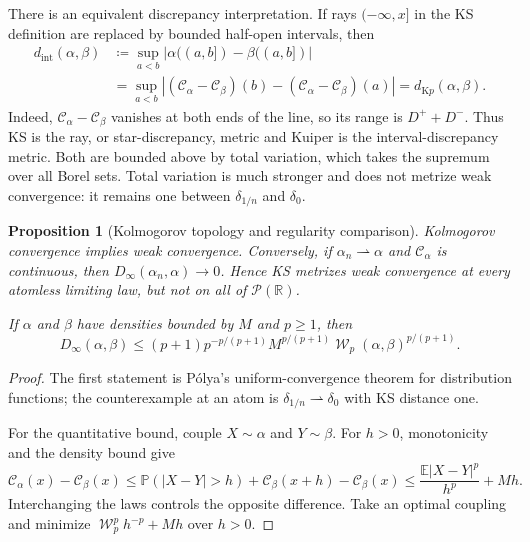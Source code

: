 \documentclass[11pt]{article}
\newtheorem{proposition}[theorem]{Proposition}
\newcommand{\RR}{\mathbb R}
\newcommand{\Pp}{\mathcal P}
\newcommand{\PP}{\mathbb P}
\newcommand{\EE}{\mathbb E}
\newcommand{\al}{\alpha}
\newcommand{\be}{\beta}
\newcommand{\de}{\delta}
\newcommand{\Cc}{\mathcal C}
\newcommand{\cumul}[1]{\Cc_{#1}}
\DeclareMathOperator{\Wass}{\mathcal W}
\newcommand{\eqdef}{\coloneqq}
\begin{document}
There is an equivalent discrepancy interpretation.  If rays $(-\infty,x]$
in the KS definition are replaced by bounded half-open intervals, then
\begin{equation}\label{eq:interval-discrepancy}
 \begin{aligned}
 d_{\mathrm{int}}(\al,\be)
 &\eqdef\sup_{a<b}|\al((a,b])-\be((a,b])| \\
 &=\sup_{a<b}|(\cumul{\al}-\cumul{\be})(b)
                 -(\cumul{\al}-\cumul{\be})(a)|
 =d_{\mathrm Kp}(\al,\be).
 \end{aligned}
\end{equation}
Indeed, $\cumul{\al}-\cumul{\be}$ vanishes at both ends of the line, so its range is
$D^++D^-$.  Thus KS is the ray, or star-discrepancy, metric and Kuiper is the
interval-discrepancy metric.  Both are bounded above by total variation,
which takes the supremum over all Borel sets.  Total variation is much
stronger and does not metrize weak convergence: it remains one between
$\de_{1/n}$ and $\de_0$.

\begin{proposition}[Kolmogorov topology and regularity comparison]
\label{prop:ks-topology}
Kolmogorov convergence implies weak convergence.  Conversely, if
$\al_n\rightharpoonup\al$ and $\cumul{\al}$ is continuous, then
$D_\infty(\al_n,\al)\to0$.  Hence KS metrizes weak convergence at every
atomless limiting law, but not on all of $\Pp(\RR)$.

If $\al$ and $\be$ have densities bounded by $M$ and $p\geq1$, then
\begin{equation}\label{eq:ks-from-wp-density}
 D_\infty(\al,\be)
 \leq (p+1)p^{-p/(p+1)}
 M^{p/(p+1)}\Wass_p(\al,\be)^{p/(p+1)}.
\end{equation}
\end{proposition}

\begin{proof}
The first statement is P\'olya's uniform-convergence theorem for distribution
functions; the counterexample at an atom is
$\de_{1/n}\rightharpoonup\de_0$ with KS distance one.

For the quantitative bound, couple $X\sim\al$ and $Y\sim\be$.  For
$h>0$, monotonicity and the density bound give
\[
 \cumul{\al}(x)-\cumul{\be}(x)
 \leq \PP(|X-Y|>h)+\cumul{\be}(x+h)-\cumul{\be}(x)
 \leq \frac{\EE|X-Y|^p}{h^p}+Mh.
\]
Interchanging the laws controls the opposite difference.  Take an optimal
coupling and minimize $\Wass_p^p h^{-p}+Mh$ over $h>0$.
\end{proof}
\end{document}
